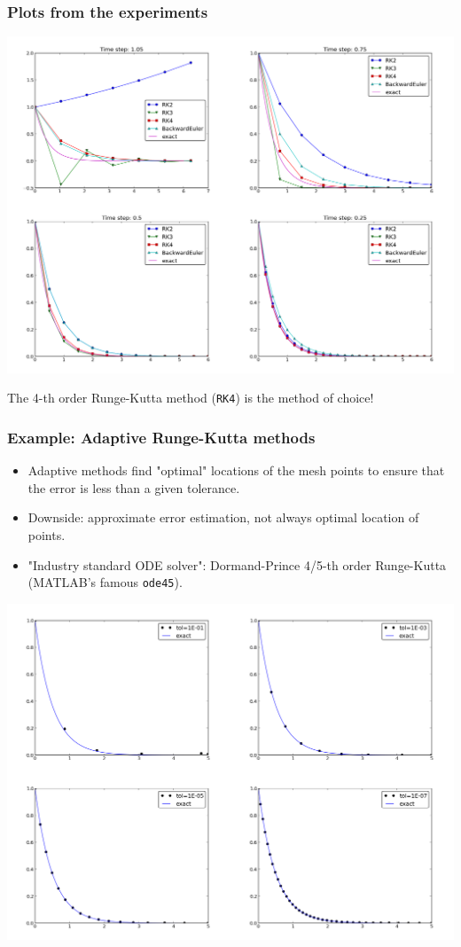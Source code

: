 \documentclass{beamer}
\begin{document}
\begin{frame}
\frametitle{Plots from the experiments}

\centerline{\includegraphics[width=0.9\linewidth]{fig-genz/decay_odespy1_png.png}}



The 4-th order Runge-Kutta method (\texttt{RK4}) is the method of choice!
\end{frame}

\begin{frame}
\frametitle{Example: Adaptive Runge-Kutta methods}

\begin{itemize}
 \item Adaptive methods find "optimal" locations of the mesh points
   to ensure that the error is less than a given tolerance.

 \item Downside: approximate error estimation, not always optimal
   location of points.

 \item "Industry standard ODE solver": Dormand-Prince 4/5-th order
   Runge-Kutta (MATLAB's famous \texttt{ode45}).
\end{itemize}

\noindent
\centerline{\includegraphics[width=0.9\linewidth]{fig-genz/decay_DormandPrince_adaptivity.png}}
\end{frame}
\end{document}
